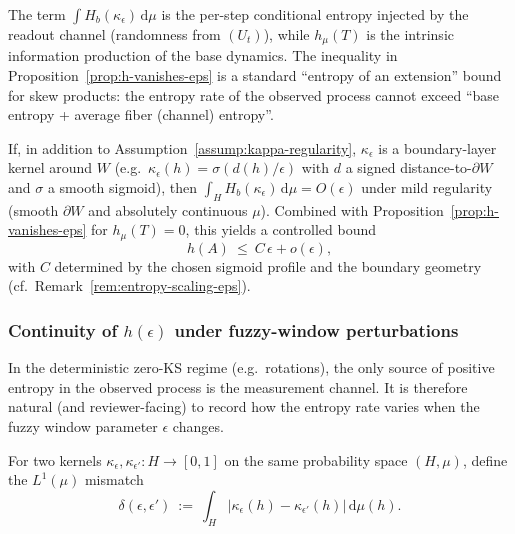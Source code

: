 \begin{remark}\label{rem:upper-bound-intuition}
The term $\int H_b(\kappa_\epsilon)\,\mathrm{d}\mu$ is the per-step conditional entropy injected by the readout channel (randomness from $(U_t)$), while $h_\mu(T)$ is the intrinsic information production of the base dynamics. The inequality in Proposition~\ref{prop:h-vanishes-eps} is a standard ``entropy of an extension'' bound for skew products: the entropy rate of the observed process cannot exceed ``base entropy + average fiber (channel) entropy''.\cite{Walters1982,Petersen1983}
\end{remark}

\begin{remark}\label{rem:h-O-eps}
If, in addition to Assumption~\ref{assump:kappa-regularity}, $\kappa_\epsilon$ is a boundary-layer kernel around $W$ (e.g.\ $\kappa_\epsilon(h)=\sigma(d(h)/\epsilon)$ with $d$ a signed distance-to-$\partial W$ and $\sigma$ a smooth sigmoid), then $\int_H H_b(\kappa_\epsilon)\,\mathrm{d}\mu = O(\epsilon)$ under mild regularity (smooth $\partial W$ and absolutely continuous $\mu$). Combined with Proposition~\ref{prop:h-vanishes-eps} for $h_\mu(T)=0$, this yields a controlled bound
\[
h(A)\ \le\ C\,\epsilon + o(\epsilon),
\]
with $C$ determined by the chosen sigmoid profile and the boundary geometry (cf.\ Remark~\ref{rem:entropy-scaling-eps}).
\end{remark}

\subsubsection{Continuity of $h(\epsilon)$ under fuzzy-window perturbations}\label{sec:readout:kernel-continuity}

In the deterministic zero-KS regime (e.g.\ rotations), the only source of positive entropy in the observed process is the measurement channel.
It is therefore natural (and reviewer-facing) to record how the entropy rate varies when the fuzzy window parameter \(\epsilon\) changes.

\begin{definition}\label{def:kappa-l1-mismatch}
For two kernels \(\kappa_\epsilon,\kappa_{\epsilon'}:H\to[0,1]\) on the same probability space \((H,\mu)\), define the $L^1(\mu)$ mismatch
\[
\delta(\epsilon,\epsilon')\ :=\ \int_H \bigl|\kappa_\epsilon(h)-\kappa_{\epsilon'}(h)\bigr|\,\mathrm{d}\mu(h).
\]
\end{definition}


